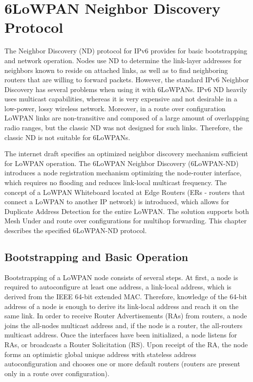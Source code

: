 \chapter{6LoWPAN Neighbor Discovery Protocol}\label{ch:nd}
The Neighbor Discovery (ND) protocol for IPv6 \cite{rfc4861} provides for basic bootstrapping and network operation. Nodes use ND to determine the link-layer addresses for neighbors known to reside on attached links, as well as to find neighboring routers that are willing to forward packets. However, the standard IPv6 Neighbor Discovery has several problems when using it with 6LoWPANs. IPv6 ND heavily uses multicast capabilities, whereas it is very expensive and not desirable in a low-power, lossy wireless network. Moreover, in a route over configuration LoWPAN links are non-transitive and composed of a large amount of overlapping radio ranges, but the classic ND was not designed for such links. Therefore, the classic ND is not suitable for 6LoWPANs. 

The internet draft \cite{draft-nd-07} specifies an optimized neighbor discovery mechanism sufficient for LoWPAN operation. The 6LoWPAN Neighbor Discovery (6LoWPAN-ND) introduces a node registration mechanism optimizing the node-router interface, which requires no flooding and reduces link-local multicast frequency.  The concept of a LoWPAN Whiteboard located at Edge Routers (ERs - routers that connect a LoWPAN to another IP network) is introduced, which allows for Duplicate Address Detection for the entire LoWPAN. The solution supports both Mesh Under and route over configurations for multihop forwarding. This chapter describes the specified 6LoWPAN-ND protocol.


\section{Bootstrapping and Basic Operation}
Bootstrapping of a LoWPAN node consists of several steps.  At first, a node is required to autoconfigure at least one address, a link-local address, which is derived from the IEEE 64-bit extended MAC.  Therefore,  knowledge of the 64-bit address of a node is enough to derive its link-local address and reach it on the same link. In order to receive Router Advertisements (RAs) from routers, a node joins the all-nodes multicast address and, if the node is a router, the all-routers multicast address. Once the interfaces have been initialized, a node listens for RAs, or broadcasts a Router Solicitation (RS). Upon receipt of the RA, the node forms an optimistic global unique address with stateless address autoconfiguration and chooses one or more default routers (routers are present only in a route over configuration). 

